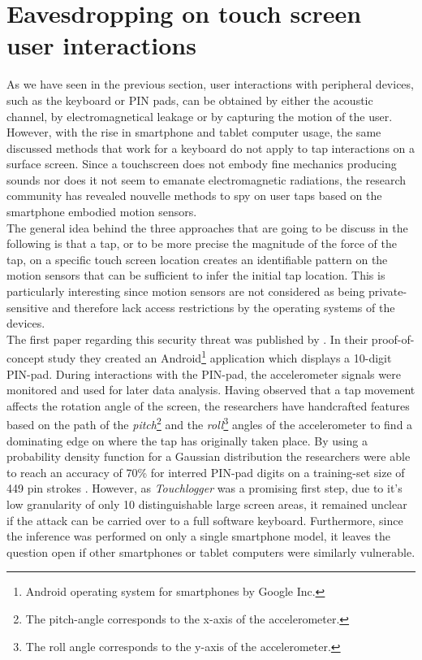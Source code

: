 \section{Eavesdropping on touch screen user interactions}
As we have seen in the previous section, user interactions with peripheral devices, such as the keyboard or PIN pads, can be obtained by either the acoustic channel, by electromagnetical leakage or by capturing the motion of the user. However, with the rise in smartphone and tablet computer usage, the same discussed methods that work for a keyboard do not apply to tap interactions on a surface screen. Since a touchscreen does not embody fine mechanics producing sounds nor does it not seem to emanate electromagnetic radiations, the research community has revealed nouvelle methods to spy on user taps based on the smartphone embodied motion sensors.\\

The general idea behind the three approaches that are going to be discuss in the following is that a tap, or to be more precise the magnitude of the force of the tap, on a specific touch screen location creates an identifiable pattern on the motion sensors that can be sufficient to infer the initial tap location. This is particularly interesting since motion sensors are not considered as being private-sensitive and therefore lack access restrictions by the operating systems of the devices.\\

The first paper regarding this security threat was published by \citeauthor{Touchlogger}. In their proof-of-concept study they created an Android\footnote{Android operating system for smartphones by Google Inc.} application which displays a 10-digit PIN-pad. During interactions with the PIN-pad, the accelerometer signals were monitored and used for later data analysis. Having observed that a tap movement affects the rotation angle of the screen, the researchers have handcrafted features based on the path of the \textit{pitch}\footnote{The pitch-angle corresponds to the x-axis of the accelerometer.} and the \textit{roll}\footnote{The roll angle corresponds to the y-axis of the accelerometer.} angles of the accelerometer to find a dominating edge on where the tap has originally taken place. By using a probability density function for a Gaussian distribution the researchers were able to reach an accuracy of 70\% for interred PIN-pad digits on a training-set size of 449 pin strokes \cite{Touchlogger}. However, as \textit{Touchlogger} was a promising first step, due to it's low granularity of only 10 distinguishable large screen areas, it remained unclear if the attack can be carried over to a full software keyboard. Furthermore, since the inference was performed on only a single smartphone model, it leaves the question open if other smartphones or tablet computers were similarly vulnerable.\\

